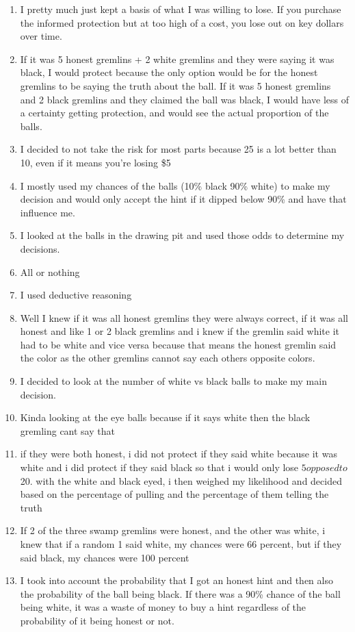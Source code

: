 \documentclass[12pt,a4paper]{article}
\begin{document}
\begin{appendices}
\begin{enumerate}
\item I pretty much just kept a basis of what I was willing to lose. If you purchase the informed protection but at too high of a cost, you lose out on key dollars over time. 
\item If it was 5 honest gremlins + 2 white gremlins and they were saying it was black, I would protect because the only option would be for the honest gremlins to be saying the truth about the ball.  If it was 5 honest gremlins and 2 black gremlins and they claimed the ball was black, I would have less of a certainty getting protection, and would see the actual proportion of the balls. 
\item I decided to not take the risk for most parts because 25 is a lot better than 10, even if it means you're losing \$5
\item I mostly used my chances of the balls (10\% black 90\% white) to make my decision and would only accept the hint if it dipped below 90\% and have that influence me.
\item I looked at the balls in the drawing pit and used those odds to determine my decisions.
\item All or nothing
\item I used deductive reasoning
\item Well I knew if it was all honest gremlins they were always correct, if it was all honest and like 1 or 2 black gremlins and i knew if the gremlin said white it had to be white and vice versa because that means the honest gremlin said the color as the other gremlins cannot say each others opposite colors. 
\item I decided to look at the number of white vs black balls to make my main decision.
\item Kinda looking at the eye balls because if it says white then the black gremling cant say that
\item if they were both honest, i did not protect if they said white because it was white and i did protect if they said black so that i would only lose $5 opposed to $20. with the white and black eyed, i then weighed my likelihood and decided based on the percentage of pulling and the percentage of them telling the truth
\item If 2 of the three swamp gremlins were honest, and the other was white, i knew that if a random 1 said white, my chances were 66 percent, but if they said black, my chances were 100 percent
\item I took into account the probability that I got an honest hint and then also the probability of the ball being black. If there was a 90\% chance of the ball being white, it was a waste of money to buy a hint regardless of the probability of it being honest or not.

\end{enumerate}
\end{appendices}
\end{document}
